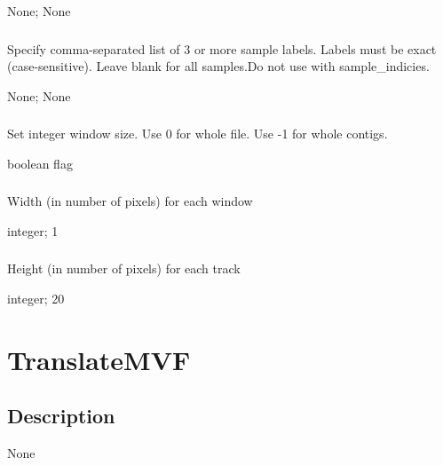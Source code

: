 \documentclass[letterpaper,11pt,english]{sphinxmanual}
\begin{document}
 None;  None


\subsubsection{}
\label{\detokenize{prog_desc:id146}}
 Specify comma-separated list of 3 or more sample labels. Labels must be exact (case-sensitive). Leave blank for all samples.Do not use with \textendash{}sample\_indicies.

 None;  None


\subsubsection{}
\label{\detokenize{prog_desc:id147}}
 Set integer window size. Use 0 for whole file. Use -1 for whole contigs.

 boolean flag


\subsubsection{}
\label{\detokenize{prog_desc:xscale}}
 Width (in number of pixels) for each window

 integer;  1


\subsubsection{}
\label{\detokenize{prog_desc:yscale}}
 Height (in number of pixels) for each track

 integer;  20


\section{TranslateMVF}
\label{\detokenize{prog_desc:translatemvf}}

\subsection{Description}
\label{\detokenize{prog_desc:id148}}
None
\end{document}
